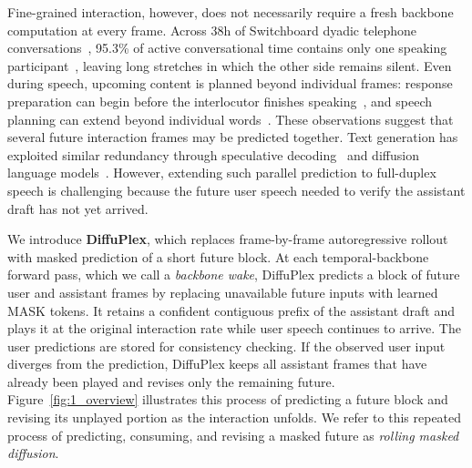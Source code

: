 Fine-grained interaction, however, does not necessarily require a fresh backbone computation at every frame.
Across 38h of Switchboard dyadic telephone conversations~\citep{225858}, 95.3\% of active conversational time contains only one speaking participant~\citep{10.3389/fpsyg.2015.00731}, leaving long stretches in which the other side remains silent.
Even during speech, upcoming content is planned beyond individual frames: response preparation can begin before the interlocutor finishes speaking~\citep{10.3389/fpsyg.2017.00393}, and speech planning can extend beyond individual words~\citep{MARTIN2010177}.
These observations suggest that several future interaction frames may be predicted together.
Text generation has exploited similar redundancy through speculative decoding~\citep{pmlr-v202-leviathan23a,chen2023acceleratinglargelanguagemodel} and diffusion language models~\citep{NEURIPS2025_48b383b2,ICLR2025_7ede97c3,fu2026nemotronlabsdiffusiontrimodelanguagemodel}.
However, extending such parallel prediction to full-duplex speech is challenging because the future user speech needed to verify the assistant draft has not yet arrived.

We introduce \textbf{DiffuPlex}, which replaces frame-by-frame autoregressive rollout with masked prediction of a short future block.
At each temporal-backbone forward pass, which we call a \textit{backbone wake}, DiffuPlex predicts a block of future user and assistant frames by replacing unavailable future inputs with learned MASK tokens.
It retains a confident contiguous prefix of the assistant draft and plays it at the original interaction rate while user speech continues to arrive.
The user predictions are stored for consistency checking.
If the observed user input diverges from the prediction, DiffuPlex keeps all assistant frames that have already been played and revises only the remaining future.
Figure~\ref{fig:1_overview} illustrates this process of predicting a future block and revising its unplayed portion as the interaction unfolds.
We refer to this repeated process of predicting, consuming, and revising a masked future as \textit{rolling masked diffusion}.

